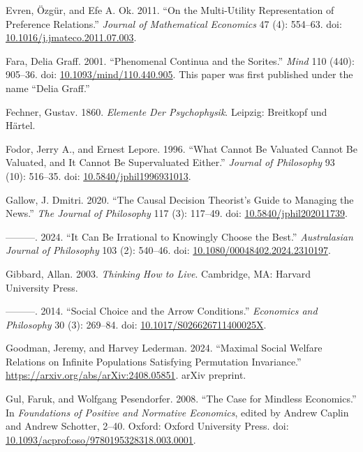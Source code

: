 \documentclass[
  11pt,
  letterpaper,
  DIV=11,
  numbers=noendperiod,
  twoside]{scrartcl}
\newlength{\cslhangindent}
\newenvironment{CSLReferences}[2] %
 {\begin{list}{}{%
  \setlength{\itemindent}{0pt}
  \setlength{\leftmargin}{0pt}
  \setlength{\parsep}{0pt}
  \ifodd #1
   \setlength{\leftmargin}{\cslhangindent}
   \setlength{\itemindent}{-1\cslhangindent}
  \fi
  \setlength{\itemsep}{#2\baselineskip}}}
 {\end{list}}
\begin{document}
\begin{CSLReferences}{1}{0}
Evren, Özgür, and Efe A. Ok. 2011. {``On the Multi-Utility
Representation of Preference Relations.''} \emph{Journal of Mathematical
Economics} 47 (4): 554--63. doi:
\href{https://doi.org/10.1016/j.jmateco.2011.07.003}{10.1016/j.jmateco.2011.07.003}.

Fara, Delia Graff. 2001. {``Phenomenal Continua and the Sorites.''}
\emph{Mind} 110 (440): 905--36. doi:
\href{https://doi.org/10.1093/mind/110.440.905}{10.1093/mind/110.440.905}.
This paper was first published under the name {``Delia Graff.''}

Fechner, Gustav. 1860. \emph{Elemente Der Psychophysik}. Leipzig:
Breitkopf und H{ä}rtel.

Fodor, Jerry A., and Ernest Lepore. 1996. {``What Cannot Be Valuated
Cannot Be Valuated, and It Cannot Be Supervaluated Either.''}
\emph{Journal of Philosophy} 93 (10): 516--35. doi:
\href{https://doi.org/10.5840/jphil1996931013}{10.5840/jphil1996931013}.

Gallow, J. Dmitri. 2020. {``The Causal Decision Theorist's Guide to
Managing the News.''} \emph{The Journal of Philosophy} 117 (3): 117--49.
doi:
\href{https://doi.org/10.5840/jphil202011739}{10.5840/jphil202011739}.

---------. 2024. {``It Can Be Irrational to Knowingly Choose the
Best.''} \emph{Australasian Journal of Philosophy} 103 (2): 540--46.
doi:
\href{https://doi.org/10.1080/00048402.2024.2310197}{10.1080/00048402.2024.2310197}.

Gibbard, Allan. 2003. \emph{Thinking How to Live}. Cambridge, MA:
Harvard University Press.

---------. 2014. {``Social Choice and the Arrow Conditions.''}
\emph{Economics and Philosophy} 30 (3): 269--84. doi:
\href{https://doi.org/10.1017/S026626711400025X}{10.1017/S026626711400025X}.

Goodman, Jeremy, and Harvey Lederman. 2024. {``Maximal Social Welfare
Relations on Infinite Populations Satisfying Permutation Invariance.''}
\url{https://arxiv.org/abs/arXiv:2408.05851}. arXiv preprint.

Gul, Faruk, and Wolfgang Pesendorfer. 2008. {``The Case for Mindless
Economics.''} In \emph{Foundations of Positive and Normative Economics},
edited by Andrew Caplin and Andrew Schotter, 2--40. Oxford: Oxford
University Press. doi:
\href{https://doi.org/10.1093/acprof:oso/9780195328318.003.0001}{10.1093/acprof:oso/9780195328318.003.0001}.


\end{CSLReferences}
\end{document}
